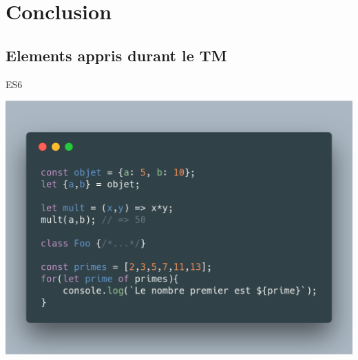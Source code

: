 \documentclass[11pt]{beamer}
\begin{document}



%


\section{Conclusion}
\subsection{Elements appris durant le TM}

\begin{frame}{ES6}

\begin{center}
	\includegraphics[scale=.2]{../images/es6}
\end{center}

\end{frame}
\end{document}
